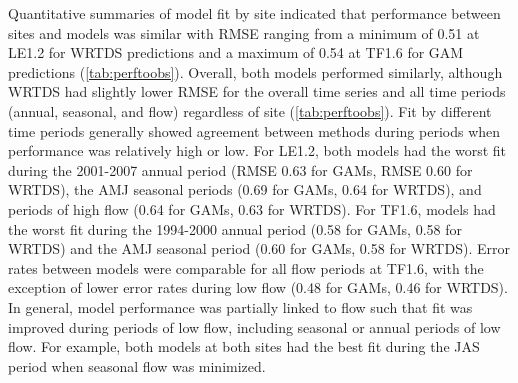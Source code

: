 \documentclass[letterpaper,12pt,oneside]{article}\usepackage[]{graphicx}\usepackage[]{color}
\begin{document}
Quantitative summaries of model fit by site indicated that performance between sites and models was similar with \ac{RMSE} ranging from a minimum of 0.51 at LE1.2 for \ac{WRTDS} predictions and a maximum of 0.54 at TF1.6 for \ac{GAM} predictions (\cref{tab:perftoobs}).  Overall, both models performed similarly, although \ac{WRTDS} had slightly lower \ac{RMSE} for the overall time series and all time periods (annual, seasonal, and flow) regardless of site (\cref{tab:perftoobs}).  Fit by different time periods generally showed agreement between methods during periods when performance was relatively high or low.  For LE1.2, both models had the worst fit during the 2001-2007 annual period (\ac{RMSE} 0.63 for \acp{GAM}, \ac{RMSE} 0.60 for \ac{WRTDS}), the \ac{AMJ} seasonal periods (0.69 for \acp{GAM}, 0.64 for \ac{WRTDS}), and periods of high flow (0.64 for \acp{GAM}, 0.63 for \ac{WRTDS}).  For TF1.6, models had the worst fit during the 1994-2000 annual period (0.58 for \acp{GAM}, 0.58 for \ac{WRTDS}) and the \ac{AMJ} seasonal period (0.60 for \acp{GAM}, 0.58 for \ac{WRTDS}).  Error rates between models were comparable for all flow periods at TF1.6, with the exception of lower error rates during low flow (0.48 for \acp{GAM}, 0.46 for \ac{WRTDS}).  In general, model performance was partially linked to flow such that fit was improved during periods of low flow, including seasonal or annual periods of low flow.  For example, both models at both sites had the best fit during the \ac{JAS} period when seasonal flow was minimized.
\end{document}
